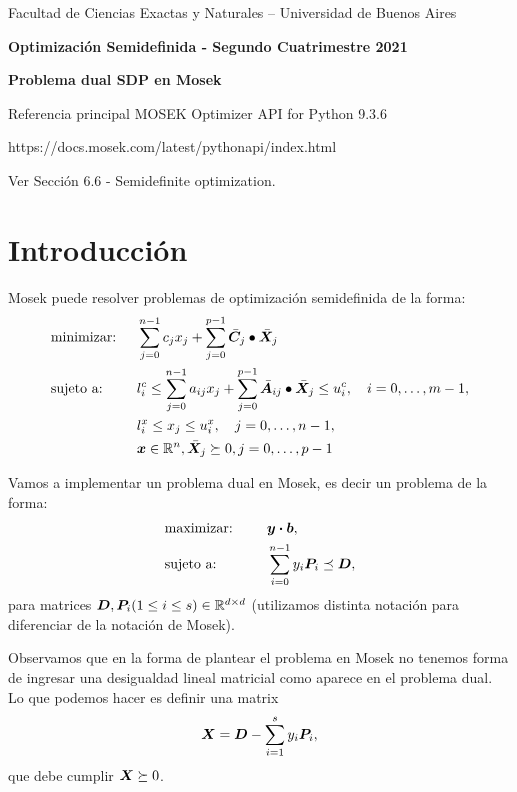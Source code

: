 \documentclass[11pt]{article}
\begin{document}
\begin{center}

{\small Facultad de Ciencias Exactas
y Naturales -- Universidad de Buenos Aires } \vskip 1cm

\textbf{{\large Optimización Semidefinida} - Segundo Cuatrimestre 2021}

\medskip\textbf{Problema dual SDP en Mosek}
\end{center}

\medskip

Referencia principal MOSEK Optimizer API for Python 9.3.6

https://docs.mosek.com/latest/pythonapi/index.html

Ver Sección 6.6 - Semidefinite optimization.

\section{Introducción}

Mosek puede resolver problemas de optimización semidefinida de la forma:
\begin{alignat*}{2}
  & \text{minimizar: } & & \sum_{j=0}^{n-1} c_j x_j + \sum_{j=0}^{p-1} \bar {\bm{C}}_j \bullet \bar {\bm{X}}_j \\
  & \text{sujeto a: }  \quad & & l_i^c \le \sum_{j=0}^{n-1} a_{ij} x_j + \sum_{j=0}^{p-1} \bar {\bm{A}}_{ij} \bullet \bar {\bm{X}}_j \le u_i^c, \quad i = 0, \dots, m-1, \\
  &  \quad & & l_i^x \le x_j \le u_i^x, \quad j = 0, \dots, n-1, \\
  & & & \bm{x} \in \mathbb{R}^n, \bar {\bm{X}}_j \succeq 0, j = 0, \dots, p-1
\end{alignat*}


Vamos a implementar un problema dual en Mosek, es decir un problema de la forma:
\begin{alignat*}{2}
  & \text{maximizar: }  & \quad & \bm{y} \boldsymbol{\cdot} \bm{b},   \\
   & \text{sujeto a: } & \quad & \sum_{i=0}^{n-1} y_i \bm{P}_i  \preceq \bm{D},
\end{alignat*}
para matrices $\bm{D}, \bm{P}_i (1 \le i \le s) \in \mathbb{R}^{d \times d}$ (utilizamos distinta notación para diferenciar de la notación de Mosek).

Observamos que en la forma de plantear el problema en Mosek no tenemos forma de ingresar una desigualdad lineal matricial como aparece en el problema dual. Lo que podemos hacer es definir una matrix 
$$
\bm{X} = \bm{D} - \sum_{i=1}^{s} y_i \bm{P}_i,
$$
que debe cumplir $\bm{X} \succeq 0$.
\end{document}
